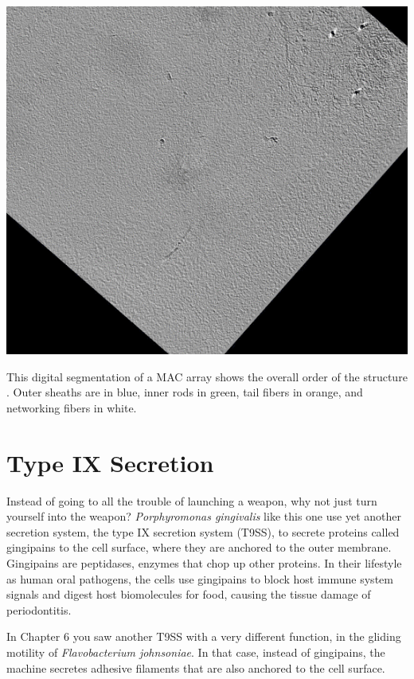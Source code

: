 \documentclass[]{tufte-book}
\begin{document}
\includegraphics{img/schematics/9_7_2}

This digital segmentation of a MAC array shows the overall order of the
structure \citep{shikuma2014}. Outer sheaths are in blue, inner rods in
green, tail fibers in orange, and networking fibers in white.

\section{Type IX Secretion}\label{type-ix-secretion}

Instead of going to all the trouble of launching a weapon, why not just
turn yourself into the weapon? \emph{Porphyromonas gingivalis} like this
one use yet another secretion system, the type IX secretion system
(T9SS), to secrete proteins called gingipains to the cell surface, where
they are anchored to the outer membrane. Gingipains are peptidases,
enzymes that chop up other proteins. In their lifestyle as human oral
pathogens, the cells use gingipains to block host immune system signals
and digest host biomolecules for food, causing the tissue damage of
periodontitis.

In Chapter 6 you saw another T9SS with a very different function, in the
gliding motility of \emph{Flavobacterium johnsoniae}. In that case,
instead of gingipains, the machine secretes adhesive filaments that are
also anchored to the cell surface.
\end{document}
